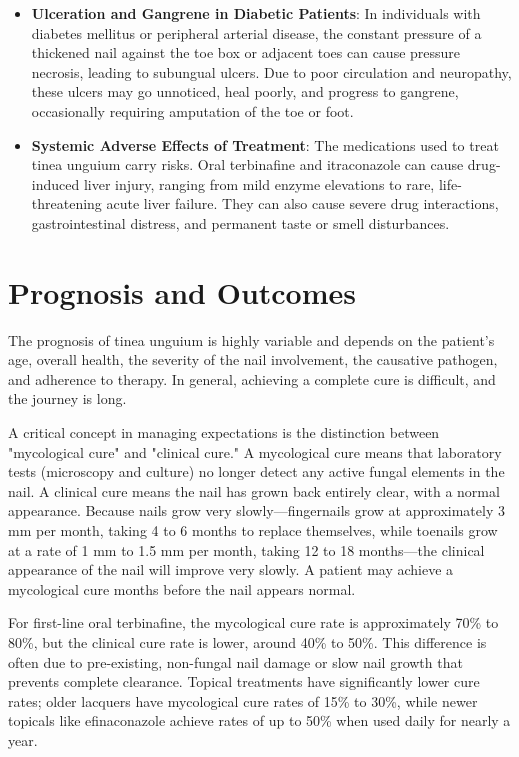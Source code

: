\begin{itemize}
    \item \textbf{Ulceration and Gangrene in Diabetic Patients}: In individuals with diabetes mellitus or peripheral arterial disease, the constant pressure of a thickened nail against the toe box or adjacent toes can cause pressure necrosis, leading to subungual ulcers. Due to poor circulation and neuropathy, these ulcers may go unnoticed, heal poorly, and progress to gangrene, occasionally requiring amputation of the toe or foot.
    \item \textbf{Systemic Adverse Effects of Treatment}: The medications used to treat tinea unguium carry risks. Oral terbinafine and itraconazole can cause drug-induced liver injury, ranging from mild enzyme elevations to rare, life-threatening acute liver failure. They can also cause severe drug interactions, gastrointestinal distress, and permanent taste or smell disturbances.
\end{itemize}

\section*{Prognosis and Outcomes}
The prognosis of tinea unguium is highly variable and depends on the patient's age, overall health, the severity of the nail involvement, the causative pathogen, and adherence to therapy. In general, achieving a complete cure is difficult, and the journey is long.

A critical concept in managing expectations is the distinction between "mycological cure" and "clinical cure." A mycological cure means that laboratory tests (microscopy and culture) no longer detect any active fungal elements in the nail. A clinical cure means the nail has grown back entirely clear, with a normal appearance. Because nails grow very slowly---fingernails grow at approximately 3 mm per month, taking 4 to 6 months to replace themselves, while toenails grow at a rate of 1 mm to 1.5 mm per month, taking 12 to 18 months---the clinical appearance of the nail will improve very slowly. A patient may achieve a mycological cure months before the nail appears normal.

For first-line oral terbinafine, the mycological cure rate is approximately 70\% to 80\%, but the clinical cure rate is lower, around 40\% to 50\%. This difference is often due to pre-existing, non-fungal nail damage or slow nail growth that prevents complete clearance. Topical treatments have significantly lower cure rates; older lacquers have mycological cure rates of 15\% to 30\%, while newer topicals like efinaconazole achieve rates of up to 50\% when used daily for nearly a year.

